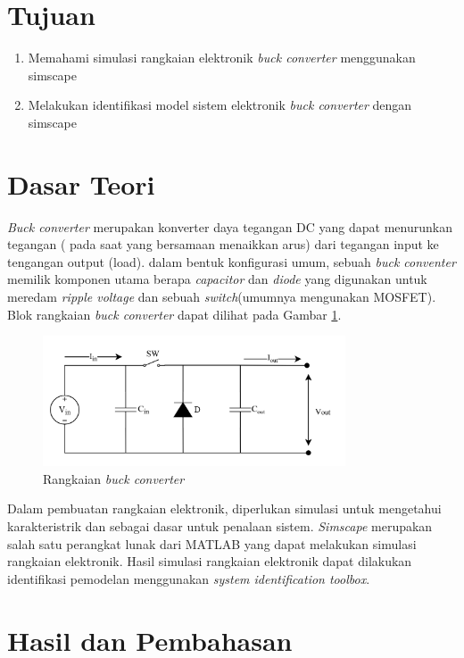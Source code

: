\documentclass[../main.tex]{subfiles}
\begin{document}
    \section{Tujuan}
        \begin{enumerate}
            \item Memahami simulasi rangkaian elektronik \textit{buck converter} menggunakan simscape
            \item Melakukan identifikasi model sistem elektronik \textit{buck converter} dengan simscape
        \end{enumerate}
    \section{Dasar Teori}
        \textit{Buck converter} merupakan konverter daya tegangan DC yang dapat menurunkan tegangan ( pada saat yang bersamaan menaikkan arus) dari tegangan input ke tengangan output (load). dalam bentuk konfigurasi umum, sebuah \textit{buck conventer} memilik komponen utama berapa \textit{capacitor} dan \textit{diode} yang digunakan untuk meredam \textit{ripple voltage} dan sebuah \textit{switch}(umumnya mengunakan MOSFET)\cite{Brown}. Blok rangkaian \textit{buck converter} dapat dilihat pada Gambar \ref{buck_converter}.
        \begin{figure}[H]
            \centering
            \includegraphics[width = 0.8\textwidth]{assets/image/buck_converter.png}
            \caption{Rangkaian \textit{buck converter}}
            \label{buck_converter}
        \end{figure}
        Dalam pembuatan rangkaian elektronik, diperlukan simulasi untuk mengetahui karakteristrik dan sebagai dasar untuk penalaan sistem. \textit{Simscape} merupakan salah satu perangkat lunak dari MATLAB yang dapat melakukan simulasi rangkaian elektronik. Hasil simulasi rangkaian elektronik dapat dilakukan identifikasi pemodelan menggunakan \textit{system identification toolbox}\cite{Fahmizal}.
    \section{Hasil dan Pembahasan}
\end{document}
